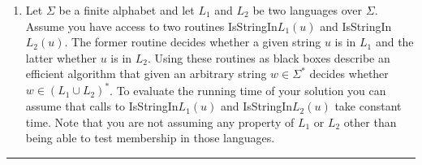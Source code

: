 \documentclass[11pt]{article}
\begin{document}


\begin{enumerate}[2.]
\item Let $\Sigma$ be a finite alphabet and let $L_1$ and $L_2$ be two
  languages over $\Sigma$. Assume you have access to two routines
  IsStringIn$L_{1}(u)$ and IsStringIn$L_{2}(u)$. The former routine decides whether a given string $u$ is in $L_1$ and the latter whether $u$ is in $L_2$. Using these routines as black boxes describe an efficient algorithm that given an arbitrary string $w \in \Sigma^*$ decides whether $w \in (L_1 \cup L_2)^*$. To evaluate the running time of your solution you can assume that calls to IsStringIn$L_{1}(u)$ and IsStringIn$L_{2}(u)$ take constant time. Note that you are not assuming any property of $L_1$ or $L_2$ other than being able to test membership in those languages.
\end{enumerate}

\hrule
\end{document}
